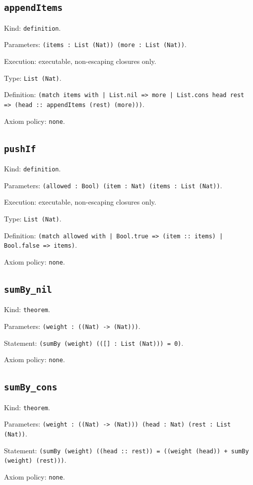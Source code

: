 \documentclass[11pt]{article}
\begin{document}
\subsection*{\texttt{appendItems}}
\noindent Kind: \texttt{definition}.\par
\noindent Parameters: \texttt{(items : List (Nat)) (more : List (Nat))}.\par
\noindent Execution: executable, non-escaping closures only.\par
\noindent Type: \texttt{List (Nat)}.\par
\noindent Definition: \texttt{(match items with | List.nil => more | List.cons head rest => (head :: appendItems (rest) (more)))}.\par
\noindent Axiom policy: \texttt{none}.\par
\subsection*{\texttt{pushIf}}
\noindent Kind: \texttt{definition}.\par
\noindent Parameters: \texttt{(allowed : Bool) (item : Nat) (items : List (Nat))}.\par
\noindent Execution: executable, non-escaping closures only.\par
\noindent Type: \texttt{List (Nat)}.\par
\noindent Definition: \texttt{(match allowed with | Bool.true => (item :: items) | Bool.false => items)}.\par
\noindent Axiom policy: \texttt{none}.\par
\subsection*{\texttt{sumBy\_nil}}
\noindent Kind: \texttt{theorem}.\par
\noindent Parameters: \texttt{(weight : ((Nat) -> (Nat)))}.\par
\noindent Statement: \texttt{(sumBy (weight) (([] : List (Nat))) = 0)}.\par
\noindent Axiom policy: \texttt{none}.\par
\subsection*{\texttt{sumBy\_cons}}
\noindent Kind: \texttt{theorem}.\par
\noindent Parameters: \texttt{(weight : ((Nat) -> (Nat))) (head : Nat) (rest : List (Nat))}.\par
\noindent Statement: \texttt{(sumBy (weight) ((head :: rest)) = ((weight (head)) + sumBy (weight) (rest)))}.\par
\noindent Axiom policy: \texttt{none}.\par
\end{document}
